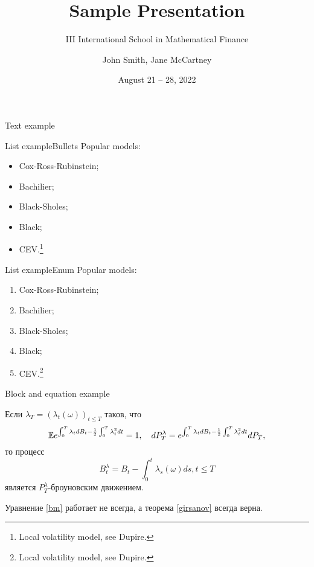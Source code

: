 \documentclass[]{vegapresentation}
\title{Sample Presentation}
\subtitle{III International School in Mathematical Finance}
\author{John Smith, Jane McCartney}
\institute{Vega Institute Foundation}
\date{August 21 -- 28, 2022}
\begin{document}
    \maketitle

    \begin{frame}{Text example}
        \lipsum[1]
    \end{frame}

    \begin{frame}{List example}{Bullets}
        Popular models:
        \begin{itemize}
            \item Cox-Ross-Rubinstein;
            \item Bachilier;
            \item Black-Sholes;
            \item Black;
            \item CEV.\footnote{Local volatility model, see Dupire.}
        \end{itemize}
    \end{frame}

    \begin{frame}{List example}{Enum}
        Popular models:
        \begin{enumerate}
            \item Cox-Ross-Rubinstein;
            \item Bachilier;
            \item Black-Sholes;
            \item Black;
            \item CEV.\footnote{Local volatility model, see Dupire.}
        \end{enumerate}
    \end{frame}

    \begin{frame}{Block  and equation example}
        \begin{theorem}[И. Гирсанов]\label{girsanov}
			Если $\lambda_T = (\lambda_t (\omega))_{t \leq T}$ таков, что 
			\begin{equation}
             \mathbb{E} e^{\int_0^T \lambda_t dB_t - \frac{1}{2}\int_0^T \lambda_t^2 dt} = 1, \quad dP_T^\lambda = e^{\int_0^T \lambda_t dB_t - \frac{1}{2}\int_0^T \lambda_t^2 dt} dP_T,
			\end{equation}
			то процесс 
			\begin{equation}\label{bm}
				B^\lambda_t = B_t - \int_0^t \lambda_s(\omega) ds, t \leq T
			\end{equation}
			 является $P_T^\lambda$-броуновским движением.
		\end{theorem}
        Уравнение \eqref{bm} работает не всегда, а теорема \ref{girsanov} всегда верна.
    \end{frame}
\end{document}
